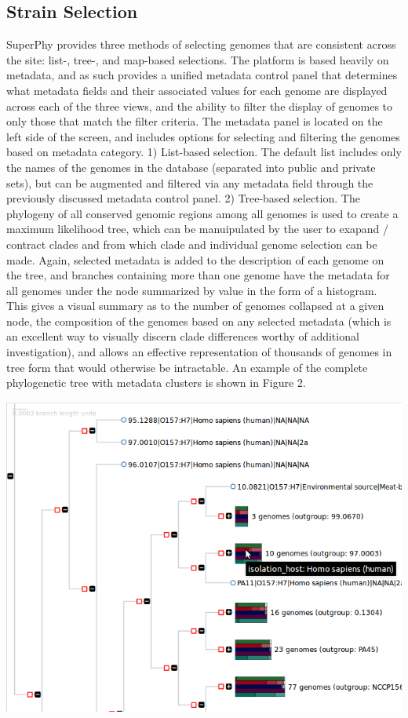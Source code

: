 \documentclass[doublespacing, linenumbers]{bmcart}
\begin{document}
\subsection{Strain Selection}
SuperPhy provides three methods of selecting genomes that are consistent across the site: list-, tree-, and map-based selections. The platform is based heavily on metadata, and as such provides a unified metadata control panel that determines what metadata fields and their associated values for each genome are displayed across each of the three views, and the ability to filter the display of genomes to only those that match the filter criteria. The metadata panel is located on the left side of the screen, and includes options for selecting and filtering the genomes based on metadata category.
 1) List-based selection. The default list includes only the names of the genomes in the database (separated into public and private sets), but can be augmented and filtered via any metadata field through the previously discussed metadata control panel.
 2) Tree-based selection. The phylogeny of all conserved genomic regions among all genomes is used to create a maximum likelihood tree, which can be manuipulated by the user to exapand / contract clades and from which clade and individual genome selection can be made. Again, selected metadata is added to the description of each genome on the tree, and branches containing more than one genome have the metadata for all genomes under the node summarized by value in the form of a histogram. This gives a visual summary as to the number of genomes collapsed at a given node, the composition of the genomes based on any selected metadata (which is an excellent way to visually discern clade differences worthy of additional investigation), and allows an effective representation of thousands of genomes in tree form that would otherwise be intractable. An example of the complete phylogenetic tree with metadata clusters is shown in Figure 2.

\includegraphics[width=\textwidth]{images/superphy_tree_tooltip.png}
\end{document}
